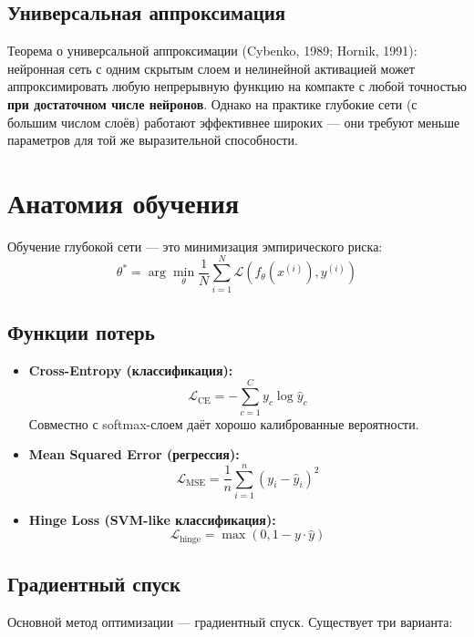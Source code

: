 \documentclass[a4paper,12pt]{article}
\begin{document}
\subsection{Универсальная аппроксимация}

Теорема о универсальной аппроксимации (Cybenko, 1989; Hornik, 1991): нейронная сеть с одним скрытым слоем и нелинейной активацией может аппроксимировать любую непрерывную функцию на компакте с любой точностью \textbf{при достаточном числе нейронов}. Однако на практике глубокие сети (с большим числом слоёв) работают эффективнее широких — они требуют меньше параметров для той же выразительной способности.

\section{Анатомия обучения}

Обучение глубокой сети — это минимизация эмпирического риска:
\[
\theta^* = \arg\min_\theta \frac{1}{N} \sum_{i=1}^{N} \mathcal{L}(f_\theta(x^{(i)}), y^{(i)})
\]

\subsection{Функции потерь}

\begin{itemize}
    \item \textbf{Cross-Entropy (классификация):}
    \[
    \mathcal{L}_{\text{CE}} = -\sum_{c=1}^{C} y_c \log \hat{y}_c
    \]
    Совместно с softmax-слоем даёт хорошо калиброванные вероятности.
    
    \item \textbf{Mean Squared Error (регрессия):}
    \[
    \mathcal{L}_{\text{MSE}} = \frac{1}{n} \sum_{i=1}^{n} (y_i - \hat{y}_i)^2
    \]
    
    \item \textbf{Hinge Loss (SVM-like классификация):}
    \[
    \mathcal{L}_{\text{hinge}} = \max(0, 1 - y \cdot \hat{y})
    \]
\end{itemize}

\subsection{Градиентный спуск}

Основной метод оптимизации — градиентный спуск. Существует три варианта:
\end{document}

